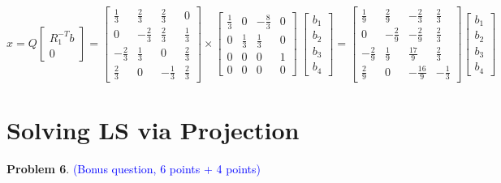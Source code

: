 \documentclass[english,onecolumn]{IEEEtran}
\begin{document}
\begin{enumerate}
$$
x=
Q\left[\begin{array}{c}
	R_{1}^{-T} b \\
	0
\end{array}\right]=
\begin{bmatrix}
	\frac{1}{3}&\frac{2}{3}&\frac{2}{3}&0\\
	0&-\frac{2}{3}&\frac{2}{3}&\frac{1}{3}\\
	-\frac{2}{3}&\frac{1}{3}&0&\frac{2}{3}\\
	\frac{2}{3}&0&-\frac{1}{3}&\frac{2}{3}
\end{bmatrix} \times
\begin{bmatrix}
	\frac{1}{3}&0&-\frac{8}{3}&0\\
	0&\frac{1}{3}&\frac{1}{3}&0\\
	0&0&0&1\\
	0&0&0&0
\end{bmatrix}\
\begin{bmatrix}
	b_1\\
	b_2\\
	b_3\\
	b_4
\end{bmatrix}=
\begin{bmatrix}
	\frac{1}{9}&\frac{2}{9}&-\frac{2}{3}&\frac{2}{3}\\
	0&-\frac{2}{9}&-\frac{2}{9}&\frac{2}{3}\\
	-\frac{2}{9}&\frac{1}{9}&\frac{17}{9}&\frac{2}{3}\\
	\frac{2}{9}&0&-\frac{16}{9}&-\frac{1}{3}
\end{bmatrix}
\begin{bmatrix}
	b_1\\
	b_2\\
	b_3\\
	b_4
\end{bmatrix}\
$$

\end{enumerate}

\newpage
\section{Solving LS via Projection}
\noindent\textbf{Problem 6}. \textcolor{blue}{(Bonus question, 6 points + 4 points)}
\end{document}
